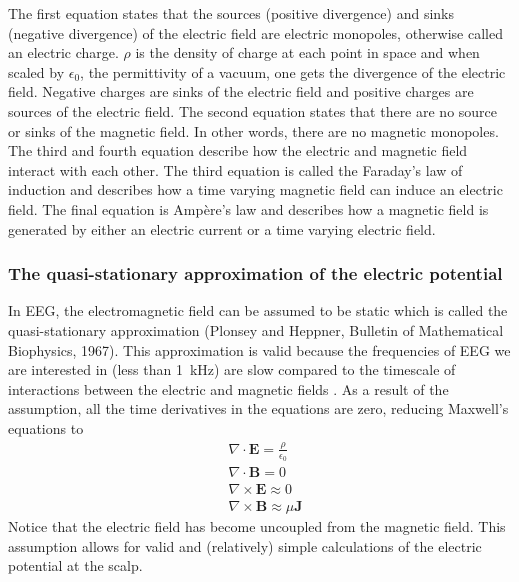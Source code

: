 The first equation states that the sources (positive divergence) and sinks (negative divergence) of the electric field are electric monopoles, otherwise called an electric charge. $\rho$ is the density of charge at each point in space and when scaled by $\epsilon_0$, the permittivity of a vacuum, one gets the divergence of the electric field. Negative charges are sinks of the electric field and positive charges are sources of the electric field. The second equation states that there are no source or sinks of the magnetic field. In other words, there are no magnetic monopoles. The third and fourth equation describe how the electric and magnetic field interact with each other. The third equation is called the Faraday's law of induction and describes how a time varying magnetic field can induce an electric field. The final equation is Ampère's law and describes how a magnetic field is generated by either an electric current or a time varying electric field.

\subsubsection{The quasi-stationary approximation of the electric potential}
In EEG, the electromagnetic field can be assumed to be static which is called the quasi-stationary approximation (Plonsey and Heppner, Bulletin of Mathematical Biophysics, 1967). This approximation is valid because the frequencies of EEG we are interested in (less than \qty{1}{\kilo\hertz}) are slow compared to the timescale of interactions between the electric and magnetic fields \cite{RevModPhys.65.413}. As a result of the assumption, all the time derivatives in the equations are zero, reducing Maxwell's equations to
\begin{align}
    & \nabla \cdot \bm{E} = \frac{\rho}{\epsilon_0} \\
    & \nabla \cdot \bm{B} = 0 \\ 
    & \nabla \times \bm{E} \approx 0 \label{eq:QSA_induction} \\ 
    & \nabla \times \bm{B} \approx \mu \bm{J} \label{eq:QSA_amp_law}
\end{align}
Notice that the electric field has become uncoupled from the magnetic field. This assumption allows for valid and (relatively) simple calculations of the electric potential at the scalp.

